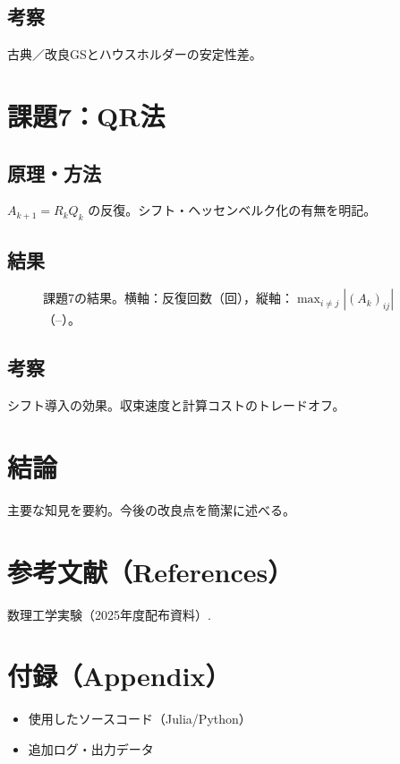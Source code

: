 \documentclass[a4paper,11pt]{ltjsarticle}
\begin{document}
\subsection{考察}
古典／改良GSとハウスホルダーの安定性差。

\section{課題7：QR法}
\subsection{原理・方法}
$A_{k+1}=R_kQ_k$ の反復。シフト・ヘッセンベルク化の有無を明記。
\subsection{結果}
\begin{figure}[H]
  \centering
  \caption{課題7の結果。横軸：反復回数（回），縦軸：$\max_{i\ne j}|(A_k)_{ij}|$（–）。}
  \label{fig:t7}
\end{figure}
\subsection{考察}
シフト導入の効果。収束速度と計算コストのトレードオフ。

\section{結論}
主要な知見を要約。今後の改良点を簡潔に述べる。

\section*{参考文献（References）}
\begin{thebibliography}{99}
 数理工学実験（2025年度配布資料）.
\end{thebibliography}

\section*{付録（Appendix）}
\begin{itemize}
  \item 使用したソースコード（Julia/Python）
  \item 追加ログ・出力データ
\end{itemize}
\end{document}
